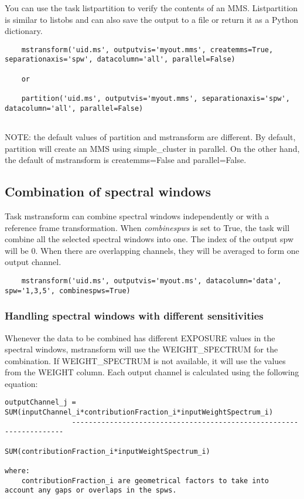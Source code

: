 You can use the task listpartition to verify the contents of an MMS.
Listpartition is similar to listobs and can also save the output to a file
or return it as a Python dictionary.

\begin{verbatim}
    mstransform('uid.ms', outputvis='myout.mms', createmms=True, separationaxis='spw', datacolumn='all', parallel=False)
    
    or
    
    partition('uid.ms', outputvis='myout.mms', separationaxis='spw', datacolumn='all', parallel=False)
    
\end{verbatim}

NOTE: the default values of partition and mstransform are different.
By default, partition will create an MMS using simple_cluster in parallel.
On the other hand, the default of mstransform is createmms=False and
parallel=False.

\subsection{Combination of spectral windows}
Task mstransform can combine spectral windows independently or
with a reference frame transformation. When {\it combinespws} is set to True, the task will
combine all the selected spectral windows into one. The index of the output spw
will be 0. When there are overlapping channels, they will be averaged to form one
output channel.

\begin{verbatim}
    mstransform('uid.ms', outputvis='myout.ms', datacolumn='data', spw='1,3,5', combinespws=True)
\end{verbatim}

\subsubsection{Handling spectral windows with different sensitivities}
Whenever the data to be combined has different EXPOSURE values in the spectral
windows, mstransform will use the WEIGHT\_SPECTRUM for the combination. If
WEIGHT\_SPECTRUM is not available, it will use the values from the WEIGHT
column. Each output channel is calculated using the following equation:

\begin{verbatim}
outputChannel_j = SUM(inputChannel_i*contributionFraction_i*inputWeightSpectrum_i) 
                --------------------------------------------------------------------
                        SUM(contributionFraction_i*inputWeightSpectrum_i)

where:
    contributionFraction_i are geometrical factors to take into account any gaps or overlaps in the spws.
\end{verbatim}

